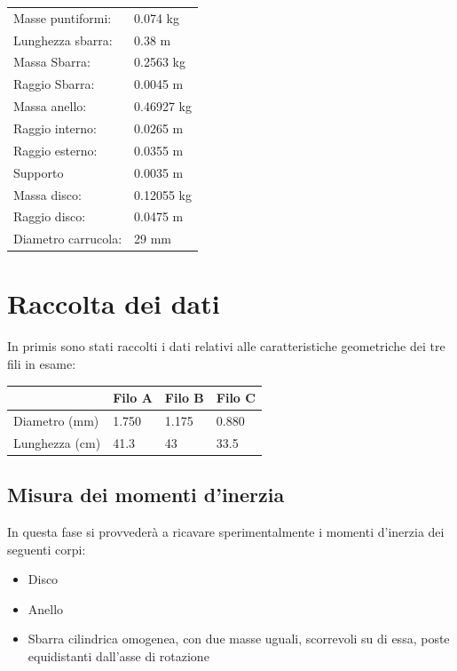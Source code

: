 \documentclass[a4paper,10pt]{report}
\begin{document}
\begin{tabular}{ll}
Masse puntiformi: & 0.074 kg\\
Lunghezza sbarra: & 0.38 m\\
Massa Sbarra: & 0.2563 kg\\
Raggio Sbarra: & 0.0045 m\\

\midrule

Massa anello: & 0.46927 kg\\
Raggio interno: & 0.0265 m\\
Raggio esterno: & 0.0355 m\\

\midrule

Supporto & 0.0035 m\\

\midrule

Massa disco: & 0.12055 kg\\
Raggio disco: & 0.0475 m\\
Diametro carrucola: & 29 mm\\

\end{tabular}


\section{Raccolta dei dati}

In primis sono stati raccolti i dati relativi alle caratteristiche geometriche dei tre fili in esame:

\begin{tabular}{l|l|l|l}

 & Filo A & Filo B & Filo C \\
\midrule
Diametro (mm) & 1.750 & 1.175 & 0.880 \\

Lunghezza (cm) & 41.3 &  43 & 33.5 \\
\midrule
\end{tabular}

\subsection{Misura dei momenti d'inerzia}

In questa fase si provvederà a ricavare  sperimentalmente i momenti d'inerzia dei seguenti corpi:
\begin{itemize}
\item Disco 
\item Anello
\item Sbarra cilindrica omogenea, con due masse uguali, scorrevoli su di essa, poste equidistanti dall’asse di rotazione
\end{itemize}
\end{document}

